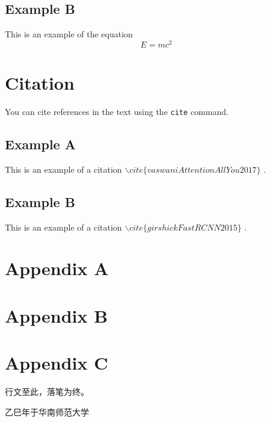 \documentclass{NEXT-SCNUThesis}
\begin{document}
    \subsection{Example B}
    This is an example of the equation
    \begin{equation}
        E=mc^{2}
    \end{equation}

    \section{Citation}
    You can cite references in the text using the \texttt{cite} command.
    \subsection{Example A}
    This is an example of a citation
    $\backslash cite\{vaswaniAttentionAllYou2017\}$
    \cite{vaswaniAttentionAllYou2017}.
    \subsection{Example B}
    This is an example of a citation $\backslash cite\{girshickFastRCNN2015\}$ \cite{girshickFastRCNN2015}.
    
    \appendix
    \section{Appendix A}
    \section{Appendix B}
    \section{Appendix C}

    \acknowledgements
    行文至此，落笔为终。
    
    \hfill 乙巳年于华南师范大学
\end{document}
